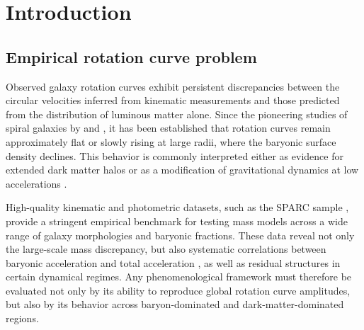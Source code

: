 \documentclass[twocolumn,linenumbers]{aastex701}
\begin{document}

\section{Introduction}

\subsection{Empirical rotation curve problem}

Observed galaxy rotation curves exhibit persistent discrepancies between the
circular velocities inferred from kinematic measurements and those predicted
from the distribution of luminous matter alone. Since the pioneering studies
of spiral galaxies by \citet{rubin1980} and \citet{bosma1981}, it has been
established that rotation curves remain approximately flat or slowly rising
at large radii, where the baryonic surface density declines. This behavior
is commonly interpreted either as evidence for extended dark matter halos
\citep{nfw1997} or as a modification of gravitational dynamics at low
accelerations \citep{milgrom1983}.

High-quality kinematic and photometric datasets, such as the SPARC sample
\citep{lelli2016}, provide a stringent empirical benchmark for testing mass
models across a wide range of galaxy morphologies and baryonic fractions.
These data reveal not only the large-scale mass discrepancy, but also
systematic correlations between baryonic acceleration and total acceleration
\citep{mcgaugh2016, lelli2017}, as well as residual structures in certain
dynamical regimes. Any phenomenological framework must therefore be evaluated
not only by its ability to reproduce global rotation curve amplitudes, but
also by its behavior across baryon-dominated and dark-matter-dominated regions.
\end{document}
